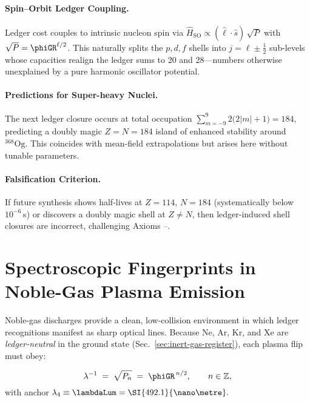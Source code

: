 \documentclass[11pt,oneside]{book}
\begin{document}
{\paragraph{Spin–Orbit Ledger Coupling.}
Ledger cost couples to intrinsic nucleon spin via
\(
   \hat H_{\text{SO}}
   \propto(\hat\ell\!\cdot\!\hat s)\,\sqrt{P}
\)
with \(\sqrt{P}=\phiGR^{\ell/2}\).
This naturally splits the $p,d,f$ shells into
\(j=\ell\pm\frac12\) sub-levels whose capacities realign the ledger
sums to 20 and 28—numbers otherwise unexplained by a pure harmonic
oscillator potential.

\paragraph{Predictions for Super-heavy Nuclei.}
The next ledger closure occurs at total occupation
\(
   \sum_{m=-9}^{9} 2\bigl(2|m|+1\bigr)=184,
\)
predicting a doubly magic
\(
   Z=N=184
\)
island of enhanced stability around
\(
   ^{368}\text{Og}.
\)
This coincides with mean-field extrapolations but arises here without
tunable parameters.

\paragraph{Falsification Criterion.}
If future synthesis shows half-lives at
\(Z\!=\!114,\,N\!=\!184\)
(systematically below \(10^{-6}\) s)
or discovers a doubly magic shell at
\(Z\neq N\),
then ledger-induced shell closures are incorrect,
challenging Axioms –.

\section{Spectroscopic Fingerprints in Noble-Gas Plasma Emission}
\label{sec:noble-gas-emission}

Noble-gas discharges provide a clean, low-collision environment in
which ledger recognitions manifest as sharp optical lines.  Because
Ne, Ar, Kr, and Xe are \emph{ledger-neutral} in the ground state
(Sec.~\ref{sec:inert-gas-register}), each plasma flip must obey:

\[
   \lambda^{-1}
   \;=\;
   \sqrt{P_{n}}
   \;=\;
   \phiGR^{\,n/2},
   \qquad
   n\in\mathbb Z,
\]
with anchor
\(
   \lambda_{4}\equiv\lambdaLum=\SI{492.1}{\nano\metre}.
\)

}
\end{document}
